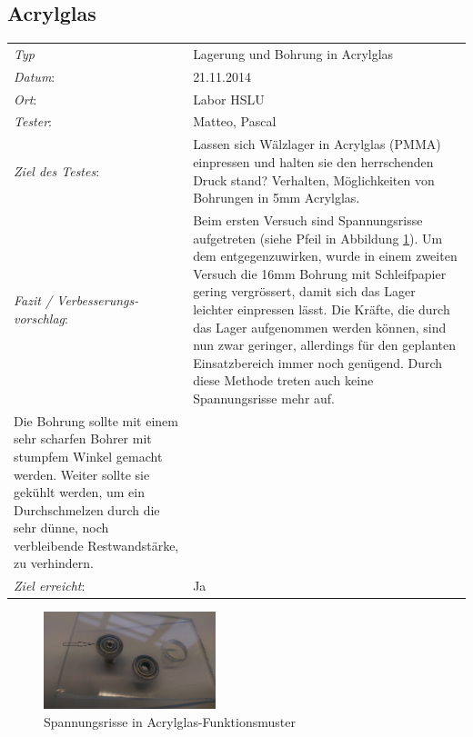 \subsection{Acrylglas}
\begin{tabular}{p{3.6cm}p{9.4cm}}
	\textit{Typ}              & Lagerung und Bohrung in Acrylglas  \\ 
	\textit{Datum}:           & 21.11.2014   \\
	\textit{Ort}:             & Labor HSLU \\
	\textit{Tester}:          & Matteo, Pascal\\
	\textit{Ziel des Testes}: & Lassen sich Wälzlager in Acrylglas (PMMA) einpressen und halten sie den herrschenden Druck stand? Verhalten, Möglichkeiten von Bohrungen in 5mm Acrylglas.   \\
	\textit{Fazit / Verbesserungs-\newline vorschlag}: & Beim ersten Versuch sind Spannungsrisse aufgetreten (siehe Pfeil in Abbildung \ref{abb:LagerPlexiglas}). 
	Um dem entgegenzuwirken, wurde in einem zweiten Versuch die 16mm Bohrung mit 
	Schleifpapier gering vergrössert, damit sich das Lager leichter einpressen lässt. 
	Die Kräfte, die durch das Lager aufgenommen werden können, sind nun zwar 
	geringer, allerdings für den geplanten Einsatzbereich immer noch genügend. 
	Durch diese Methode treten auch keine Spannungsrisse mehr auf.  \\
	
	Die Bohrung sollte mit einem sehr scharfen Bohrer mit stumpfem Winkel 
	gemacht werden. Weiter sollte sie gekühlt werden, um ein Durchschmelzen 
	durch die sehr dünne, noch verbleibende Restwandstärke, zu verhindern.  \\
	
	\textit{Ziel erreicht}:& Ja\\
\end{tabular}
\begin{figure}[h!]
	\includegraphics[width=5cm]{Funktionstests/Bilder/LagerPlexiglas.jpg}
	\centering
	\caption{Spannungsrisse in Acrylglas-Funktionsmuster} 
	\label{abb:LagerPlexiglas}
\end{figure}
